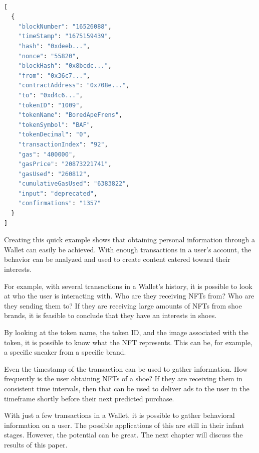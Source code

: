 \begin{center}
\begin{lstlisting}[label=lst:apiResult ,language=python, caption={A real-world example of the response to the API request from listing \ref{lst:apiCall}. The result contains a variety of information, such as the transaction timestamp, the sender's public address (from), and the receivers public address (to). The response is provided by the \textit{Etherscan} API \cite{etherscan}.}, captionpos=b]

[
  {
    "blockNumber": "16526088",
    "timeStamp": "1675159439",
    "hash": "0xdeeb...",
    "nonce": "55820",
    "blockHash": "0x8bcdc...",
    "from": "0x36c7...",
    "contractAddress": "0x708e...",
    "to": "0xd4c6...",
    "tokenID": "1009",
    "tokenName": "BoredApeFrens",
    "tokenSymbol": "BAF",
    "tokenDecimal": "0",
    "transactionIndex": "92",
    "gas": "400000",
    "gasPrice": "20873221741",
    "gasUsed": "260812",
    "cumulativeGasUsed": "6383822",
    "input": "deprecated",
    "confirmations": "1357"
  }
]
\end{lstlisting}
\end{center}

Creating this quick example shows that obtaining personal information through a Wallet can easily be achieved. With enough transactions in a user's account, the behavior can be analyzed and used to create content catered toward their interests.

For example, with several transactions in a Wallet's history, it is possible to look at who the user is interacting with. Who are they receiving NFTs from? Who are they sending them to? If they are  receiving large amounts of NFTs from shoe brands, it is feasible to conclude that they have an interests in shoes.

By looking at the token name, the token ID, and the image associated with the token, it is possible to know what the NFT represents. This can be, for example, a specific sneaker from a specific brand.

Even the timestamp of the transaction can be used to gather information. How frequently is the user obtaining NFTs of a shoe? If they are receiving them in consistent time intervals, then that can be used to deliver ads to the user in the timeframe shortly before their next predicted purchase.

With just a few transactions in a Wallet, it is possible to gather behavioral information on a user. The possible applications of this are still in their infant stages. However, the potential can be great. The next chapter will discuss the results of this paper.